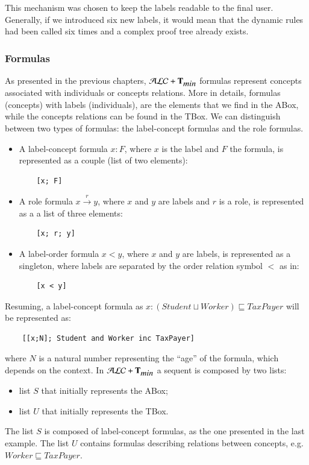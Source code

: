 \documentclass[a4paper, 11pt, oneside]{elsarticle}
\newcommand{\tip}{{\bf T}}
\newcommand{\alctmin}{\mathcal{ALC}+\tip_{\mbox{\em min}}}
\newcommand{\trans}[1]{\stackrel{#1}{\longrightarrow}}
\begin{document}
This mechanism was chosen to keep the labels readable to the final user.
Generally, if we introduced six new labels, it would mean that the dynamic rules had been called six times and a complex proof tree already exists.

\subsubsection{Formulas}
As presented in the previous chapters, $\alctmin$ formulas represent concepts associated with individuals or concepts relations.
More in details, formulas (concepts) with labels (individuals), are the elements that we find in the ABox, while the concepts relations can be found in the TBox.
We can distinguish between two types of formulas: the label-concept formulas and the role formulas.
\begin{itemize}
\item A label-concept formula $x : F$, where $x$ is the label and $F$ the formula, is represented as a couple (list of two elements):
\begin{verbatim}
    [x; F]
\end{verbatim}
\item A role formula $x \trans{r} y$, where $x$ and $y$ are labels and $r$ is a role, is represented as a a list of three elements:
\begin{verbatim}
    [x; r; y]
\end{verbatim}
\item A label-order formula $x < y$, where $x$ and $y$ are labels, is represented as a singleton, where labels are separated by the order relation symbol $<$ as in:
\begin{verbatim}
    [x < y]
\end{verbatim}
\end{itemize}
Resuming, a label-concept formula as $x : (Student \sqcup Worker) \sqsubseteq TaxPayer$ will be represented as:
\begin{verbatim}
    [[x;N]; Student and Worker inc TaxPayer]
\end{verbatim}

where $N$ is a natural number representing the ``age'' of the formula, which depends on the context.
In $\alctmin$ a sequent is composed by two lists:
\begin{itemize}
\item list $S$ that initially represents the ABox;
\item list $U$ that initially represents the TBox.
\end{itemize}
The list $S$ is composed of label-concept formulas, as the one presented in the last example.
The list $U$ contains formulas describing relations between concepts, e.g. $Worker \sqsubseteq TaxPayer$.
\end{document}

